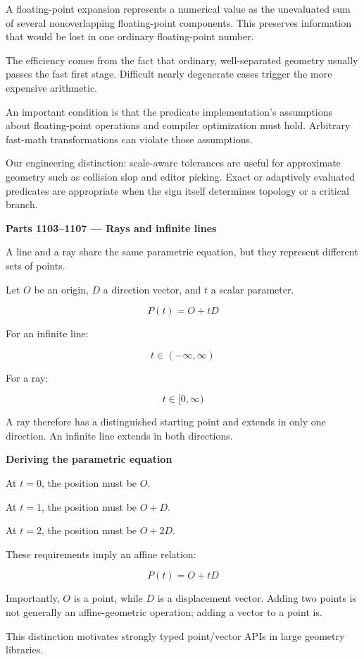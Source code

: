 A floating-point expansion represents a numerical value as the unevaluated sum of several nonoverlapping floating-point components. This preserves information that would be lost in one ordinary floating-point number.

The efficiency comes from the fact that ordinary, well-separated geometry usually passes the fast first stage. Difficult nearly degenerate cases trigger the more expensive arithmetic.

An important condition is that the predicate implementation's assumptions about floating-point operations and compiler optimization must hold. Arbitrary fast-math transformations can violate those assumptions.

Our engineering distinction: scale-aware tolerances are useful for approximate geometry such as collision slop and editor picking. Exact or adaptively evaluated predicates are appropriate when the sign itself determines topology or a critical branch.

\textbf{Parts 1103--1107 --- Rays and infinite lines}

A line and a ray share the same parametric equation, but they represent different sets of points.

Let \(O\) be an origin, \(D\) a direction vector, and \(t\) a scalar parameter.

\[
\boxed{P(t)=O+tD}
\]

For an infinite line:

\[
t\in(-\infty,\infty)
\]

For a ray:

\[
t\in[0,\infty)
\]

A ray therefore has a distinguished starting point and extends in only one direction. An infinite line extends in both directions.

\textbf{Deriving the parametric equation}

At \(t=0\), the position must be \(O\).

At \(t=1\), the position must be \(O+D\).

At \(t=2\), the position must be \(O+2D\).

These requirements imply an affine relation:

\[
P(t)=O+tD
\]

Importantly, \(O\) is a point, while \(D\) is a displacement vector. Adding two points is not generally an affine-geometric operation; adding a vector to a point is.

This distinction motivates strongly typed point/vector APIs in large geometry libraries.

